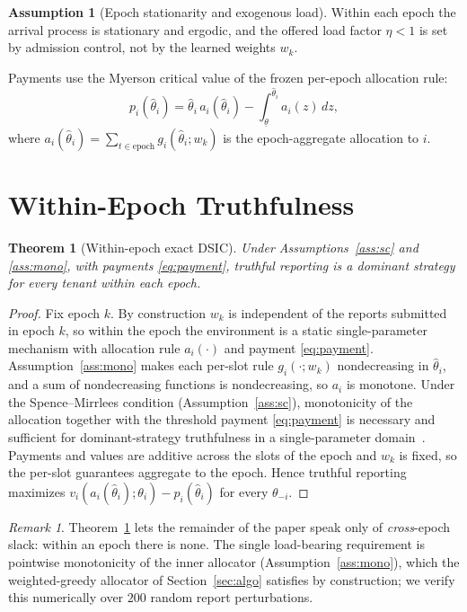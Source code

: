 \documentclass[conference]{IEEEtran}
\newtheorem{theorem}{Theorem}
\theoremstyle{definition}
\newtheorem{assumption}{Assumption}
\theoremstyle{remark}
\newtheorem{remark}{Remark}
\newcommand{\load}{\eta}
\newcommand{\type}{\theta}
\newcommand{\wt}{w}
\newcommand{\val}{v}
\begin{document}
\begin{assumption}[Epoch stationarity and exogenous load]\label{ass:stat}
Within each epoch the arrival process is stationary and ergodic, and the offered load factor $\load<1$ is set by admission control, not by the learned weights $\wt_k$.
\end{assumption}

Payments use the Myerson critical value of the frozen per-epoch allocation rule:
\begin{equation}\label{eq:payment}
p_i(\hat\type_i)=\hat\type_i\,a_i(\hat\type_i)-\int_{\underline{\type}}^{\hat\type_i} a_i(z)\,dz,
\end{equation}
where $a_i(\hat\type_i)=\sum_{t\in\text{epoch}}g_i(\hat\type_i;\wt_k)$ is the epoch-aggregate allocation to $i$.

\section{Within-Epoch Truthfulness}\label{sec:dsic}

\begin{theorem}[Within-epoch exact DSIC]\label{thm:dsic}
Under Assumptions~\ref{ass:sc} and \ref{ass:mono}, with payments \eqref{eq:payment}, truthful reporting is a dominant strategy for every tenant within each epoch.
\end{theorem}

\begin{proof}
Fix epoch $k$. By construction $\wt_k$ is independent of the reports submitted in epoch $k$, so within the epoch the environment is a static single-parameter mechanism with allocation rule $a_i(\cdot)$ and payment \eqref{eq:payment}. Assumption~\ref{ass:mono} makes each per-slot rule $g_i(\cdot;\wt_k)$ nondecreasing in $\hat\type_i$, and a sum of nondecreasing functions is nondecreasing, so $a_i$ is monotone. Under the Spence--Mirrlees condition (Assumption~\ref{ass:sc}), monotonicity of the allocation together with the threshold payment \eqref{eq:payment} is necessary and sufficient for dominant-strategy truthfulness in a single-parameter domain~\cite{ref:myerson}. Payments and values are additive across the slots of the epoch and $\wt_k$ is fixed, so the per-slot guarantees aggregate to the epoch. Hence truthful reporting maximizes $\val_i(a_i(\hat\type_i);\type_i)-p_i(\hat\type_i)$ for every $\type_{-i}$.
\end{proof}

\begin{remark}
Theorem~\ref{thm:dsic} lets the remainder of the paper speak only of \emph{cross}-epoch slack: within an epoch there is none. The single load-bearing requirement is pointwise monotonicity of the inner allocator (Assumption~\ref{ass:mono}), which the weighted-greedy allocator of Section~\ref{sec:algo} satisfies by construction; we verify this numerically over $200$ random report perturbations.
\end{remark}
\end{document}
